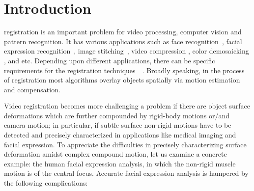 \documentclass[10pt,journal]{IEEEtran}
\begin{document}
\maketitle


\IEEEdisplaynotcompsoctitleabstractindextext


%
\IEEEpeerreviewmaketitle


\section{Introduction}

 registration is an important problem for video processing, computer vision and pattern recognition. It has various applications such as face recognition~\cite{Wagner2009}, facial expression recognition~\cite{Valstar12}, image stitching~\cite{Szeliski06}, video compression \cite{h264}, color demosaicking \cite{wu}, and etc. Depending upon different applications, there can be specific requirements for the registration techniques~\cite{Uenohara95}~\cite{Caspi_PAMI02}. \textcolor[rgb]{1,0,0}{Broadly speaking, in the process of registration most algorithms overlay objects spatially via motion estimation and compensation. 
}

\textcolor[rgb]{1,0,0}{Video registration becomes more challenging a problem if there are object surface deformations which are further compounded by rigid-body motions or/and camera motion; in particular, if subtle surface non-rigid motions have to be detected and precisely characterized in applications like medical imaging and facial expression. To appreciate the difficulties in precisely characterizing surface deformation amidst complex compound motion, let us examine a concrete example: the human facial expression analysis, in which the non-rigid muscle motion is of the central focus.  Accurate facial expression analysis is hampered by the following complications:} 
\end{document}
